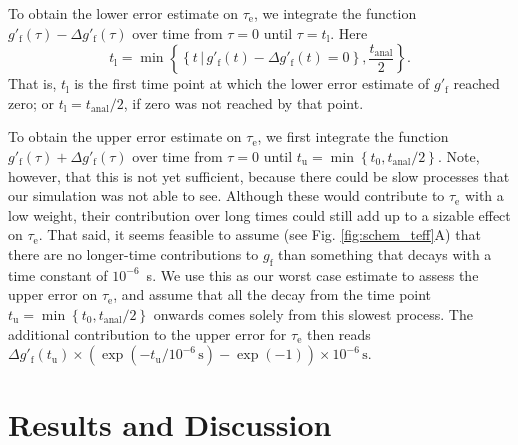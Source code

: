 \documentclass[journal=jpcbfk,manuscript=article,layout=twocolumn]{achemso}
\begin{document}
To obtain the lower error estimate on $\tau_\mathrm e$, we integrate the function
$g'_{\mathrm{f}}(\tau) - \Delta g'_{\mathrm{f}}(\tau)$ over time from $\tau=0$ until $\tau=t_\mathrm l$.
Here
\begin{equation}
t_\mathrm l= \min
\left\{
	\left\{
		t\,|\,g'_{\mathrm{f}}(t) - \Delta g'_{\mathrm{f}}(t) = 0
	\right\},
	\frac{t_\mathrm{anal}}{2}
\right\}.
\end{equation}
That is,
$t_\mathrm l$ is
the first time point at which the lower error estimate of $g'_\mathrm f$ reached zero;
or $t_\mathrm l=t_\mathrm{anal}/2$, if zero was not reached by that point.

To obtain the upper error estimate on $\tau_\mathrm e$, we first integrate the function
$g'_{\mathrm{f}}(\tau) + \Delta g'_{\mathrm{f}}(\tau)$ over time from $\tau=0$ until
$
t_\mathrm u= \min
\left\{
	t_0,
	{t_\mathrm{anal}}/{2}
\right\}.
$
Note, however,
that this is not yet sufficient, because there could be slow processes that our simulation was not
able to see. Although these would contribute to $\tau_\mathrm e$ with a low weight,
their contribution over long times could still add up to a sizable effect on $\tau_\mathrm e$.
%
That said, it seems feasible to assume (see Fig. \ref{fig:schem_teff}A) that there are no longer-time contributions
to $g_\mathrm f$ than something that decays with a time constant of $10^{-6}$~s.
%
We use this as our worst case estimate to assess the upper error on $\tau_\mathrm e$, and
%
assume that all the decay from the time point
$
t_\mathrm u= \min
\left\{
	t_0,
	{t_\mathrm{anal}}/{2}
\right\}
$
onwards comes solely from this slowest process.
%
The additional contribution to the upper error for $\tau_\mathrm e$ then reads
$
\Delta g'_\mathrm f(t_\mathrm u) \times \left(\exp(-t_\mathrm u / 10^{-6}\,\mathrm s) - \exp(-1)\right) \times 10^{-6}\,\mathrm s.
$


\section{Results and Discussion}
\end{document}
